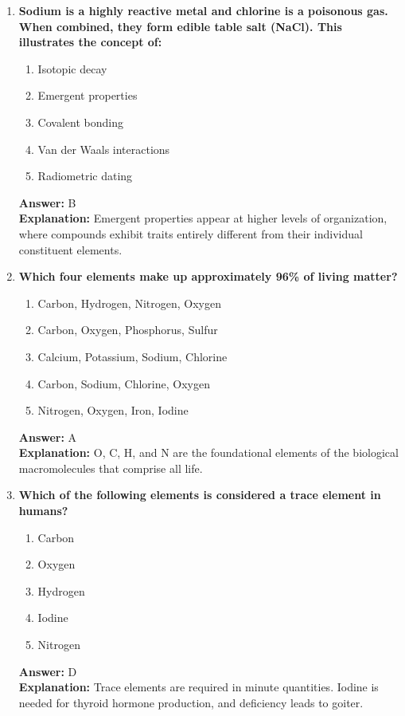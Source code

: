 \documentclass[11pt, a4paper]{article}
\begin{document}
\begin{enumerate}
\item \textbf{Sodium is a highly reactive metal and chlorine is a poisonous gas. When combined, they form edible table salt (NaCl). This illustrates the concept of:}
\begin{enumerate}[label=\Alph*.]
    \item Isotopic decay
    \item Emergent properties
    \item Covalent bonding
    \item Van der Waals interactions
    \item Radiometric dating
\end{enumerate}
\textbf{Answer:} B \\
\textbf{Explanation:} Emergent properties appear at higher levels of organization, where compounds exhibit traits entirely different from their individual constituent elements.

\item \textbf{Which four elements make up approximately 96\% of living matter?}
\begin{enumerate}[label=\Alph*.]
    \item Carbon, Hydrogen, Nitrogen, Oxygen
    \item Carbon, Oxygen, Phosphorus, Sulfur
    \item Calcium, Potassium, Sodium, Chlorine
    \item Carbon, Sodium, Chlorine, Oxygen
    \item Nitrogen, Oxygen, Iron, Iodine
\end{enumerate}
\textbf{Answer:} A \\
\textbf{Explanation:} O, C, H, and N are the foundational elements of the biological macromolecules that comprise all life.

\item \textbf{Which of the following elements is considered a trace element in humans?}
\begin{enumerate}[label=\Alph*.]
    \item Carbon
    \item Oxygen
    \item Hydrogen
    \item Iodine
    \item Nitrogen
\end{enumerate}
\textbf{Answer:} D \\
\textbf{Explanation:} Trace elements are required in minute quantities. Iodine is needed for thyroid hormone production, and deficiency leads to goiter.


\end{enumerate}
\end{document}
